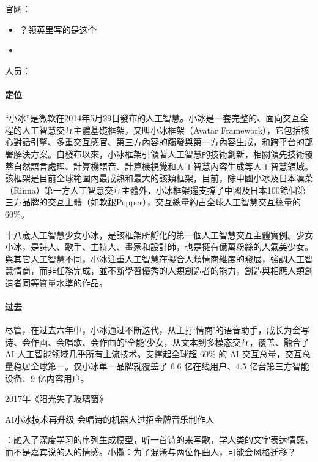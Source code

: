 \documentclass[letterpaper,11pt,english]{sphinxmanual}
\begin{document}
官网：
\begin{itemize}
\item {} 
 ？领英里写的是这个

\item {} 

\end{itemize}

人员：


\paragraph{定位}
\label{\detokenize{chapter_company/xiaoice:id3}}
“小冰”是微軟在2014年5月29日發布的人工智慧。小冰是一套完整的、面向交互全程的人工智慧交互主體基礎框架，又叫小冰框架（Avatar
Framework），它包括核心對話引擎、多重交互感官、第三方內容的觸發與第一方內容生成，和跨平台的部署解決方案。自發布以來，小冰框架引領著人工智慧的技術創新，相關領先技術覆蓋自然語言處理、計算機語音、計算機視覺和人工智慧內容生成等人工智慧領域。該框架是目前全球範圍內最成熟和最大的該類框架，目前，除中國小冰及日本凜菜（Rinna）第一方人工智慧交互主體外，小冰框架還支撐了中國及日本100餘個第三方品牌的交互主體（如軟銀Pepper），交互總量約占全球人工智慧交互總量的60\%。

十八歲人工智慧少女小冰，是該框架所孵化的第一個人工智慧交互主體實例。少女小冰，是詩人、歌手、主持人、畫家和設計師，也是擁有億萬粉絲的人氣美少女。與其它人工智慧不同，小冰注重人工智慧在擬合人類情商維度的發展，強調人工智慧情商，而非任務完成，並不斷學習優秀的人類創造者的能力，創造與相應人類創造者同等質量水準的作品。


\paragraph{过去}
\label{\detokenize{chapter_company/xiaoice:id4}}
尽管，在过去六年中，小冰通过不断迭代，从主打‘情商’的语音助手，成长为会写诗、会作画、会唱歌、会作曲的‘全能’少女，从文本到多模态交互，覆盖、融合了
AI 人工智能领域几乎所有主流技术。支撑起全球超 60\% 的 AI
交互总量，交互总量稳居全球第一。仅小冰单一品牌就覆盖了 6.6
亿在线用户、4.5 亿台第三方智能设备、9 亿内容用户。

2017年《阳光失了玻璃窗》

AI小冰技术再升级
会唱诗的机器人过招金牌音乐制作人%
\begin{footnote}[932]\sphinxAtStartFootnote
{}
%
\end{footnote}：融入了深度学习的序列生成模型，听一首诗的来写歌，学人类的文字表达情感，而不是嘉宾说的人的情感。小撒：为了混淆与两位作曲人，可能会风格迁移？
\end{document}
